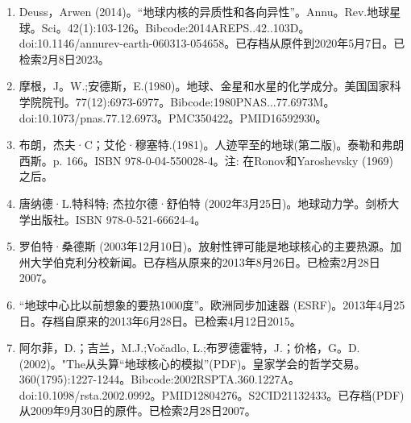 \begin{enumerate}
\item Deuss，Arwen (2014)。“地球内核的异质性和各向异性”。Annu。Rev.地球星球。Sci。42(1):103-126。Bibcode:2014AREPS..42..103D。doi:10.1146/annurev-earth-060313-054658。已存档从原件到2020年5月7日。已检索2月8日2023。
\item 摩根，J。W.;安德斯，E.(1980)。地球、金星和水星的化学成分。美国国家科学院院刊。77(12):6973-6977。Bibcode:1980PNAS...77.6973M。doi:10.1073/pnas.77.12.6973。PMC350422。PMID16592930。  
\item 布朗，杰夫·C；艾伦·穆塞特.(1981)。人迹罕至的地球(第二版)。泰勒和弗朗西斯。p. 166。ISBN 978-0-04-550028-4。注: 在Ronov和Yaroshevsky (1969) 之后。
\item 唐纳德·L.特科特; 杰拉尔德·舒伯特 (2002年3月25日)。地球动力学。剑桥大学出版社。ISBN 978-0-521-66624-4。
\item 罗伯特·桑德斯 (2003年12月10日)。放射性钾可能是地球核心的主要热源。加州大学伯克利分校新闻。已存档从原来的2013年8月26日。已检索2月28日2007。
\item “地球中心比以前想象的要热1000度”。欧洲同步加速器 (ESRF)。2013年4月25日。存档自原来的2013年6月28日。已检索4月12日2015。
\item 阿尔菲，D.；吉兰，M.J.;Vočadlo, L.;布罗德霍特，J.；价格，G。D.(2002)。"The从头算“地球核心的模拟”(PDF)。皇家学会的哲学交易。360(1795):1227-1244。Bibcode:2002RSPTA.360.1227A。doi:10.1098/rsta.2002.0992。PMID12804276。S2CID21132433。已存档(PDF)从2009年9月30日的原件。已检索2月28日2007。   
 \end{enumerate}